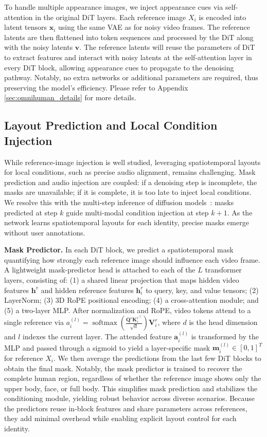 \documentclass{article} %
\begin{document}
To handle multiple appearance images, we inject appearance cues via self-attention in the original DiT layers. Each reference image $X_i$ is encoded into latent tensors ${\mathbf{x}_i}$ using the same VAE as for noisy video frames. The reference latents are then flattened into token sequences and processed by the DiT along with the noisy latents $\mathbf{v}$. The reference latents will reuse the parameters of DiT to extract features and interact with noisy latents at the self-attention layer in every DiT block, allowing appearance cues to propagate to the denoising pathway. Notably, no extra networks or additional parameters are required, thus preserving the model's efficiency. Please refer to Appendix \ref{sec:omnihuman_details} for more details.


\subsection{Layout Prediction and Local Condition Injection}
While reference-image injection is well studied, leveraging spatiotemporal layouts for local conditions, such as precise audio alignment, remains challenging. Mask prediction and audio injection are coupled: if a denoising step is incomplete, the masks are unavailable; if it is complete, it is too late to inject local conditions. We resolve this with the multi-step inference of diffusion models~\citep{song2021ddim}: masks predicted at step $k$ guide multi-modal condition injection at step $k{+}1$. As the network learns spatiotemporal layouts for each identity, precise masks emerge without user annotations.

\textbf{Mask Predictor.} In each DiT block, we predict a spatiotemporal mask quantifying how strongly each reference image should influence each video frame. A lightweight mask-predictor head is attached to each of the $L$ transformer layers, consisting of: (1) a shared linear projection that maps hidden video features $\mathbf{h}^{v}$ and hidden reference features $\mathbf{h}^{r}_i$ to query, key, and value tensors; (2) LayerNorm; (3) 3D RoPE positional encoding; (4) a cross-attention module; and (5) a two-layer MLP. After normalization and RoPE, video tokens attend to a single reference via $a_i^{(l)} = \operatorname{softmax}\left(\frac{\mathbf{Q}^{v}{\mathbf{K}^{r}_{i}}^{\top}}{\sqrt{d}}\right)\mathbf{V}^{r}_{i}$, 
where $d$ is the head dimension and $l$ indexes the current layer. The attended feature $\mathbf{a}^{(l)}_i$ is transformed by the MLP and passed through a sigmoid to yield a layer-specific mask $\mathbf{m}^{(l)}_i \in [0,1]^{T}$ for reference $X_i$. We then average the predictions from the last few DiT blocks to obtain the final mask. Notably, the mask predictor is trained to recover the complete human region, regardless of whether the reference image shows only the upper body, face, or full body. This simplifies mask prediction and stabilizes the conditioning module, yielding robust behavior across diverse scenarios. Because the predictors reuse in-block features and share parameters across references, they add minimal overhead while enabling explicit layout control for each identity.
\end{document}
